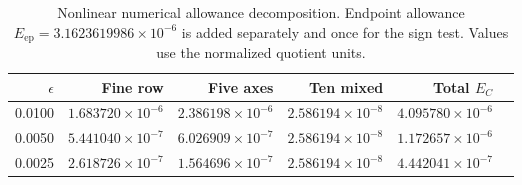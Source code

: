 \begin{table}[tbp]\centering
\caption{Nonlinear numerical allowance decomposition. Endpoint allowance $E_{\mathrm{ep}}=3.1623619986\times10^{-6}$ is added separately and once for the sign test. Values use the normalized quotient units.}\label{tab:errorbreakdown}
\begin{tabular}{rrrrrr}\toprule
$\epsilon$ & Fine row & Five axes & Ten mixed & Total $E_C$ \\\midrule
0.0100 & $1.683720\times10^{-6}$ & $2.386198\times10^{-6}$ & $2.586194\times10^{-8}$ & $4.095780\times10^{-6}$ \\
0.0050 & $5.441040\times10^{-7}$ & $6.026909\times10^{-7}$ & $2.586194\times10^{-8}$ & $1.172657\times10^{-6}$ \\
0.0025 & $2.618726\times10^{-7}$ & $1.564696\times10^{-7}$ & $2.586194\times10^{-8}$ & $4.442041\times10^{-7}$ \\
\bottomrule\end{tabular}\end{table}
